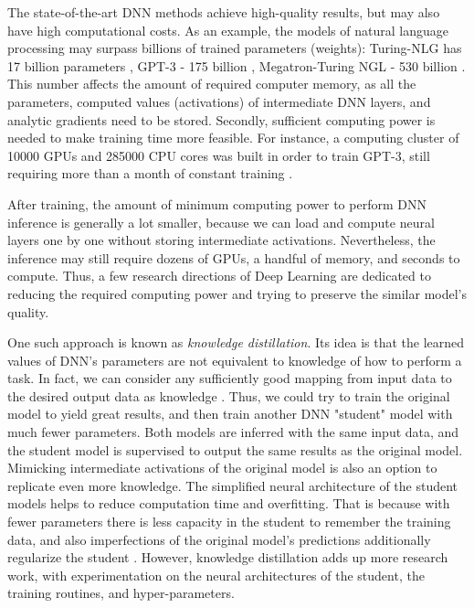 The state-of-the-art DNN methods achieve high-quality results, but may also have high computational costs. As an example, the models of natural language processing may surpass billions of trained parameters (weights): Turing-NLG has 17 billion parameters \cite{dnn:turingnlg20}, GPT-3 - 175 billion \cite{dnn:gpt3-20}, Megatron-Turing NGL - 530 billion \cite{dnn:megatron22}. This number affects the amount of required computer memory, as all the parameters, computed values (activations) of intermediate DNN layers, and analytic gradients need to be stored. Secondly, sufficient computing power is needed to make training time more feasible. For instance, a computing cluster of 10000 GPUs and 285000 CPU cores was built in order to train GPT-3, still requiring more than a month of constant training \cite{aux:openai-cluster-20}. 

After training, the amount of minimum computing power to perform DNN inference is generally a lot smaller, because we can load and compute neural layers one by one without storing intermediate activations. Nevertheless, the inference may still require dozens of GPUs, a handful of memory, and seconds to compute. Thus, a few research directions of Deep Learning are dedicated to reducing the required computing power and trying to preserve the similar model's quality.

One such approach is known as \textit{knowledge distillation}. Its idea is that the learned values of DNN's parameters are not equivalent to knowledge of how to perform a task. In fact, we can consider any sufficiently good mapping from input data to the desired output data as knowledge \cite{method:distillation15}. Thus, we could try to train the original model to yield great results, and then train another DNN "student" model with much fewer parameters. Both models are inferred with the same input data, and the student model is supervised to output the same results as the original model. Mimicking intermediate activations of the original model is also an option to replicate even more knowledge. The simplified neural architecture of the student models helps to reduce computation time and overfitting. That is because with fewer parameters there is less capacity in the student to remember the training data, and also imperfections of the original model's predictions additionally regularize the student \cite{survey:distillation21, speed:distillgan19}. However, knowledge distillation adds up more research work, with experimentation on the neural architectures of the student, the training routines, and hyper-parameters.

